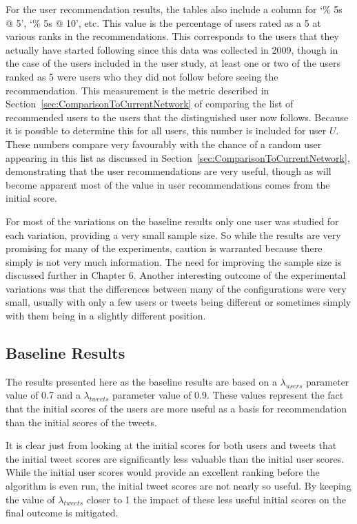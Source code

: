 For the user recommendation results, the tables also include a column for `\% 5s @ 5', `\% 5s @ 10', etc. This value is the percentage of users rated as a 5 at various ranks in the recommendations. This corresponds to the users that they actually have started following since this data was collected in 2009, though in the case of the users included in the user study, at least one or two of the users ranked as 5 were users who they did not follow before seeing the recommendation. This measurement is the metric described in Section~\ref{sec:ComparisonToCurrentNetwork} of comparing the list of recommended users to the users that the distinguished user now follows. Because it is possible to determine this for all users, this number is included for user $U$. These numbers compare very favourably with the chance of a random user appearing in this list as discussed in Section~\ref{sec:ComparisonToCurrentNetwork}, demonstrating that the user recommendations are very useful, though as will become apparent most of the value in user recommendations comes from the initial score.

For most of the variations on the baseline results only one user was studied for each variation, providing a very small sample size. So while the results are very promising for many of the experiments, caution is warranted because there simply is not very much information. The need for improving the sample size is discussed further in Chapter 6. Another interesting outcome of the experimental variations was that the differences between many of the configurations were very small, usually with only a few users or tweets being different or sometimes simply with them being in a slightly different position.

\subsection{Baseline Results}
\label{sec:BaselineResults}

The results presented here as the baseline results are based on a $\lambda_{users}$ parameter value of 0.7 and a $\lambda_{tweets}$ parameter value of 0.9. These values represent the fact that the initial scores of the users are more useful as a basis for recommendation than the initial scores of the tweets.

It is clear just from looking at the initial scores for both users and tweets that the initial tweet scores are significantly less valuable than the initial user scores. While the initial user scores would provide an excellent ranking before the algorithm is even run, the initial tweet scores are not nearly so useful. By keeping the value of $\lambda_{tweets}$ closer to 1 the impact of these less useful initial scores on the final outcome is mitigated.

